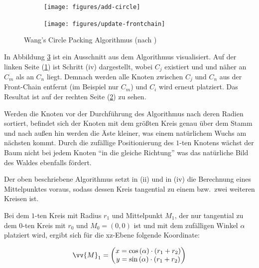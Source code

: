 \label{subsec:collision}\setlength{\fwidth}{.4\textwidth}
\begin{figure}[htb]
  \captionsetup{justification=centering}
  \begin{subfigure}[t]{\fwidth}
   \texttt{[image: figures/add-circle]}
    \label{fig:add-circle}
  \end{subfigure}
  \hspace{1cm}
  \begin{subfigure}[t]{\fwidth}
  	\texttt{[image: figures/update-frontchain]}
  	 \label{fig:update-frontchain}
  \end{subfigure}
  \caption{Wang's Circle Packing Algorithmus (nach \cite{bostock2017abetter})}
  \label{fig:circle-packing}
\end{figure}

In Abbildung \ref{fig:circle-packing} ist ein Ausschnitt aus dem Algorithmus visualisiert. Auf der linken Seite (\ref{fig:add-circle}) ist Schritt (iv) dargestellt, wobei $C_j$ existiert und und näher an $C_m$ als an $C_n$ liegt. Demnach werden alle Knoten zwischen $C_j$ und $C_n$ aus der Front-Chain entfernt (im Beispiel nur $C_m$) und $C_i$ wird erneut platziert. Das Resultat ist auf der rechten Seite (\ref{fig:update-frontchain}) zu sehen.

Werden die Knoten vor der Durchführung des Algorithmus nach deren Radien sortiert, befindet sich der Knoten mit dem größten Kreis genau über dem Stamm und nach außen hin werden die Äste kleiner, was einem natürlichem Wuchs am nächsten kommt. Durch die zufällige Positionierung des $1$-ten Knotens wächst der Baum nicht bei jedem Knoten "`in die gleiche Richtung"' was das natürliche Bild des Waldes ebenfalls fördert.

Der oben beschriebene Algorithmus setzt in (ii) und in (iv) die Berechnung eines Mittelpunktes voraus, sodass dessen Kreis tangential zu einem bzw.\ zwei weiteren Kreisen ist.

Bei dem $1$-ten Kreis mit Radius $r_1$ und Mittelpunkt $M_1$, der nur tangential zu dem $0$-ten Kreis mit $r_0$ und $M_0 = (0,0)$ ist und mit dem zufälligen Winkel $\alpha$ platziert wird, ergibt sich für die xz-Ebene folgende Koordinate:

\begin{equation}
  \vv{M}_1 =
  \begin{pmatrix}
    x = \cos\left(\alpha\right) \cdot \left(r_1 + r_2\right)\\
    y = \sin\left(\alpha\right) \cdot \left(r_1 + r_2\right)\\
  \end{pmatrix}
\end{equation}

